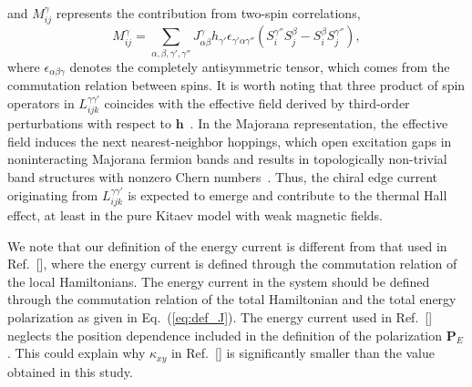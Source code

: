 \documentclass[twocolumn,superscriptaddress,showpacs, longbibliography, aps, prb]{revtex4-2}
\def\vec#1{\boldsymbol #1}
\newcommand{\red}[1]{\textcolor{red}{#1}}
\newcommand{\orange}[1]{\textcolor{orange}{#1}}
\begin{document}
and $M_{ij}^\gamma$ represents the contribution from two-spin correlations,
\begin{equation}
 M_{ij}^{\gamma} = \sum_{\alpha,\beta,\gamma',\gamma''} J_{\alpha\beta}^\gamma h_{\gamma'} \epsilon_{\gamma'\alpha\gamma''} \left(S_i^{\gamma''} S_j^{\beta} - S_i^{\beta} S_j^{\gamma''} \right),
 \label{eq:M}
\end{equation}
where $\epsilon_{\alpha\beta\gamma}$ %
denotes the completely antisymmetric tensor, which comes from the commutation relation between spins. 
It is worth noting that three product of spin operators in $L_{ijk}^{\gamma\gamma'}$ coincides with the effective field derived by third-order perturbations with respect to $\bm{h}$~\cite{NasuYM2017}.
In the Majorana representation, the effective field %
induces the next nearest-neighbor hoppings, which open excitation gaps in noninteracting Majorana fermion bands and results in topologically non-trivial band structures with nonzero Chern numbers~\cite{Kitaev2006}.
Thus, the chiral edge current originating from $L_{ijk}^{\gamma\gamma'}$ is expected to %
emerge and contribute to the thermal Hall effect, at least in the pure Kitaev model with weak magnetic fields.

We note that our definition of the energy current is 
different from that used in Ref.~[], where the energy current is defined %
through the commutation relation %
of the local Hamiltonians.
The energy current in the system should be defined %
through the commutation relation of the total Hamiltonian and the total energy polarization as given in
Eq.~(\ref{eq:def_J}). %
The energy current used in Ref.~[] 
neglects %
the position dependence included in the definition of the polarization $\vec{P}_{E}$.
This could explain why $\kappa_{xy}$ in Ref.~[] is significantly smaller than %
the value obtained %
in this study.
\end{document}
